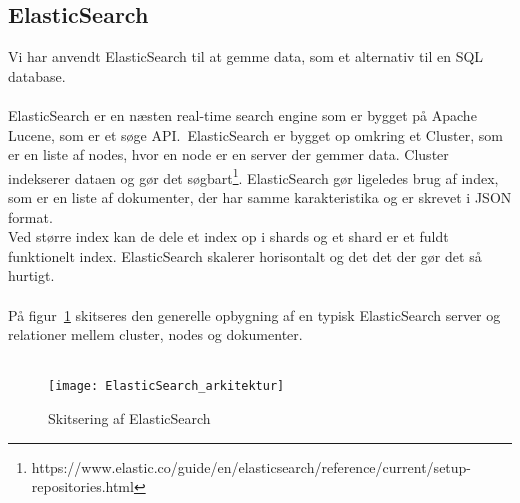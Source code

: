 \subsection{ElasticSearch}
Vi har anvendt ElasticSearch til at gemme data, som et alternativ til en SQL database.
\\\\
ElasticSearch er en næsten real-time search engine som er bygget på Apache Lucene, som er et søge API.\
ElasticSearch er bygget op omkring et Cluster, som er en liste af nodes, hvor en node er en server der gemmer data. Cluster indekserer dataen og gør det søgbart\footnote{https://www.elastic.co/guide/en/elasticsearch/reference/current/setup-repositories.html}.
ElasticSearch gør ligeledes brug af index, som er en liste af dokumenter, der har samme karakteristika og er skrevet i JSON format.
\\
Ved større index kan de dele et index op i shards og et shard er et fuldt funktionelt index.
ElasticSearch skalerer horisontalt og det det der gør det så hurtigt.
\\\\
På figur~\ref{fig:elasticsearch-arkitektur} skitseres den generelle opbygning af en typisk ElasticSearch server og relationer mellem cluster, nodes og dokumenter.
\\\\
\begin{figure}[H]
    \texttt{[image: ElasticSearch\_arkitektur]}
    \caption{Skitsering af ElasticSearch}
    \label{fig:elasticsearch-arkitektur}
\end{figure}
\hypertarget{push-or-pull}{}
